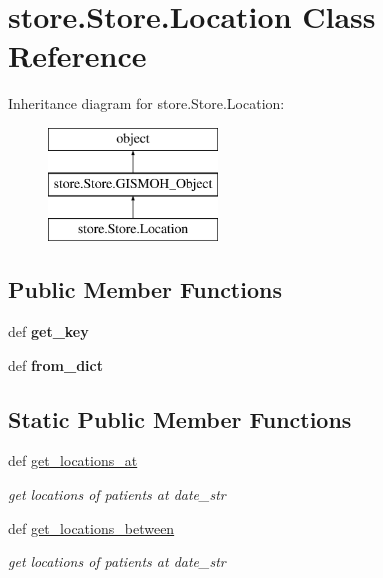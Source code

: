\hypertarget{classstore_1_1_store_1_1_location}{\section{store.\-Store.\-Location Class Reference}
\label{classstore_1_1_store_1_1_location}
}
Inheritance diagram for store.\-Store.\-Location\-:\begin{figure}[H]
\begin{center}
\leavevmode
\includegraphics[height=3.000000cm]{classstore_1_1_store_1_1_location}
\end{center}
\end{figure}
\subsection*{Public Member Functions}
\begin{DoxyCompactItemize}
\item 
\hypertarget{classstore_1_1_store_1_1_location_a4b34b2c15a0267af06c0e262f084aa1c}{def {\bfseries get\-\_\-key}}\label{classstore_1_1_store_1_1_location_a4b34b2c15a0267af06c0e262f084aa1c}

\item 
\hypertarget{classstore_1_1_store_1_1_location_a198fee5135ac3d43ddf42e3af082f8df}{def {\bfseries from\-\_\-dict}}\label{classstore_1_1_store_1_1_location_a198fee5135ac3d43ddf42e3af082f8df}

\end{DoxyCompactItemize}
\subsection*{Static Public Member Functions}
\begin{DoxyCompactItemize}
\item 
def \hyperlink{classstore_1_1_store_1_1_location_a8f91f3015909f609043208b23811ce88}{get\-\_\-locations\-\_\-at}
\begin{DoxyCompactList}\small\item\em get locations of patients at date\-\_\-str \end{DoxyCompactList}\item 
def \hyperlink{classstore_1_1_store_1_1_location_aa917f5e17b22e33f624eeba242310c80}{get\-\_\-locations\-\_\-between}
\begin{DoxyCompactList}\small\item\em get locations of patients at date\-\_\-str \end{DoxyCompactList}\end{DoxyCompactItemize}
